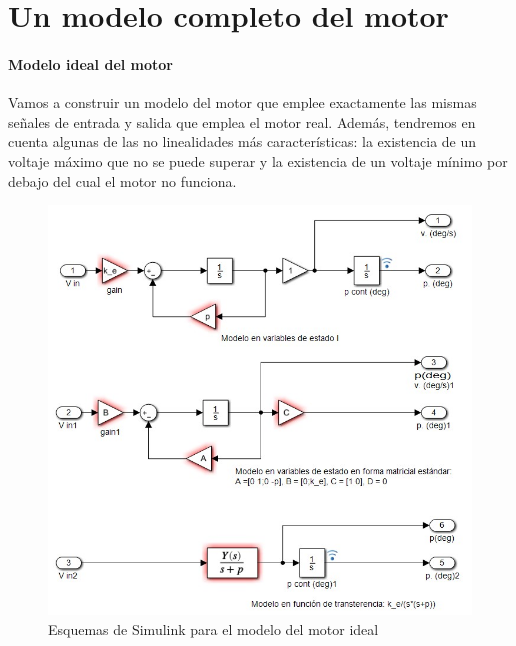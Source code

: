 \documentclass[10pt,a4paper]{report}
\begin{document}
\section{Un modelo completo del motor}\label{sec41}

\paragraph{Modelo ideal del motor} Vamos a construir un modelo del motor que emplee exactamente las mismas señales de entrada y salida que emplea el motor real. Además, tendremos en cuenta algunas de las no linealidades más características: la existencia de un voltaje máximo que no se puede superar y la existencia de un voltaje mínimo por debajo del cual el motor no funciona.

\begin{figure}[h]
\centering
\includegraphics[scale=0.8]{modelo_motor1.jpg}
\caption{Esquemas de Simulink para el modelo del motor ideal}
\label{f23}
\end{figure}
\end{document}
